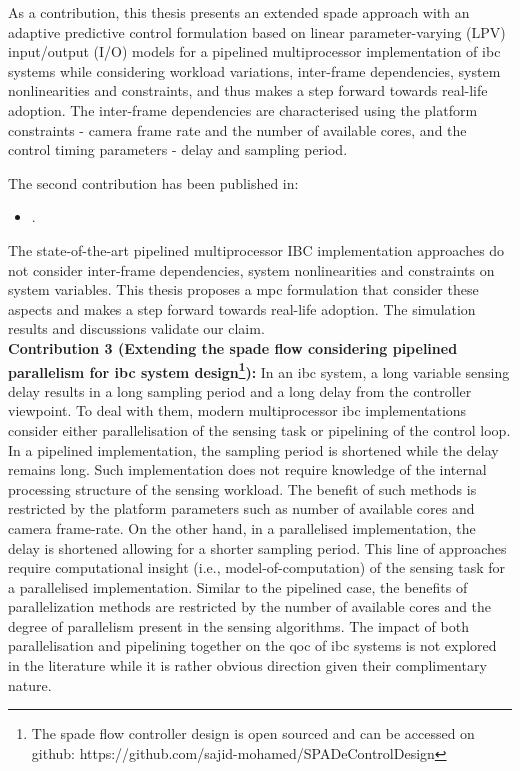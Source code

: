 As a contribution, this thesis presents an extended \gls{spade} approach with an adaptive predictive control formulation based on linear parameter-varying (LPV) input/output (I/O) models for a pipelined multiprocessor implementation of \gls{ibc} systems while considering workload variations, inter-frame dependencies, system nonlinearities and constraints, and thus makes a step forward towards real-life adoption. The inter-frame dependencies are characterised using the platform constraints - camera frame rate and the number of available cores, and the control timing parameters - delay and sampling period. 

The second contribution has been published in:
\begin{itemize}
    \item {}.
\end{itemize}
The state-of-the-art pipelined multiprocessor IBC implementation approaches do not consider inter-frame dependencies, system nonlinearities and constraints on system variables. This thesis proposes a \gls{mpc} formulation that consider these aspects and makes a step forward towards real-life adoption. The simulation results and discussions validate our claim.
\\[1ex]
\noindent
\textbf{Contribution 3 (Extending the \gls{spade} flow considering pipelined parallelism for \gls{ibc} system design\footnote{The \gls{spade} flow controller design is open sourced and can be accessed on github: https://github.com/sajid-mohamed/SPADeControlDesign}):}
In an \gls{ibc} system, a long variable sensing delay results in a long sampling period and a long delay from the controller viewpoint. To deal with them, modern multiprocessor \gls{ibc} implementations consider either parallelisation of the sensing task or pipelining of the control loop. In a pipelined implementation, the sampling period is shortened while the delay remains long. Such implementation does not require knowledge of the internal processing structure of the sensing workload. The benefit of such methods is restricted by the platform parameters such as number of available cores and camera frame-rate. On the other hand, in a parallelised implementation, the delay is shortened allowing for a shorter sampling period. This line of approaches require computational insight (i.e., model-of-computation) of the sensing task for a parallelised implementation. Similar to the pipelined case, the benefits of parallelization methods are restricted by the number of available cores and the degree of parallelism present in the sensing algorithms.  The impact of both parallelisation and pipelining together on the \gls{qoc} of \gls{ibc} systems is not explored in the literature while it is rather obvious direction given their complimentary nature. 

